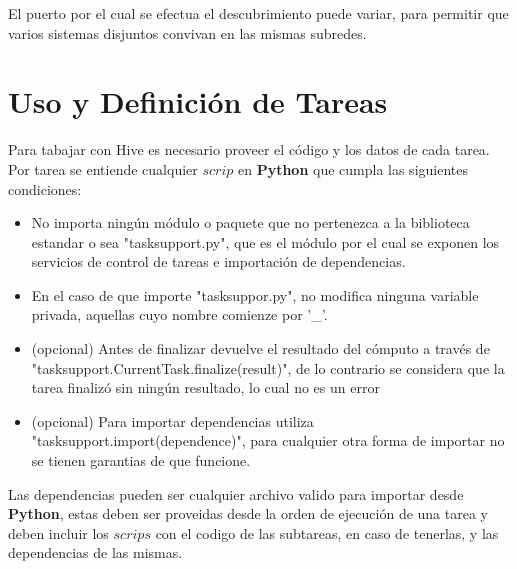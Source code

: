 \documentclass[a4paper,10pt]{article}
\begin{document}
		El puerto por el cual se efectua el descubrimiento puede variar, para permitir que varios sistemas disjuntos convivan en las mismas subredes.
		
	\section{Uso y Definición de Tareas}\label{sec_task}
		
		Para tabajar con Hive es necesario proveer el código y los datos de cada tarea. Por tarea se entiende cualquier $scrip$ en \textbf{Python} que cumpla las siguientes condiciones:
		\begin{itemize}
			\item No importa ningún módulo o paquete que no pertenezca a la biblioteca estandar o sea "tasksupport.py", que es el módulo por el cual se exponen los servicios de control de tareas e importación de dependencias.
			\item En el caso de que importe "tasksuppor.py", no modifica ninguna variable privada, aquellas cuyo nombre comienze por '\_'.
			\item (opcional) Antes de finalizar devuelve el resultado del cómputo a través de "tasksupport.CurrentTask.finalize(result)", de lo contrario se considera que la tarea finalizó sin ningún resultado, lo cual no es un error
			\item (opcional)  Para importar dependencias utiliza "tasksupport.import(dependence)", para cualquier otra forma de importar no se tienen garantias de que funcione.
		\end{itemize}
		
		Las dependencias pueden ser cualquier archivo valido para importar desde \textbf{Python}, estas deben ser proveidas desde la orden de ejecución de una tarea y deben incluir los $scrips$ con el codigo de las subtareas, en caso de tenerlas, y las dependencias de las mismas.

	
	
	
\end{document}

